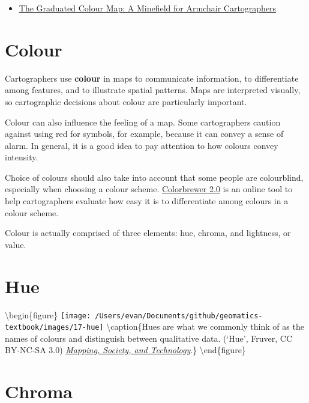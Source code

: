 \documentclass[
]{book}
\providecommand{\tightlist}{%
  \setlength{\itemsep}{0pt}\setlength{\parskip}{0pt}}
\begin{document}
\begin{itemize}
\tightlist
\item
  \href{https://gis.blog.ryerson.ca/2020/03/26/the-graduated-colour-map-a-minefield-for-armchair-cartographers/}{The Graduated Colour Map: A Minefield for Armchair Cartographers}
\end{itemize}

\hypertarget{colour}{%
\section{Colour}\label{colour}}

Cartographers use \textbf{colour} in maps to communicate information, to differentiate among features, and to illustrate spatial patterns. Maps are interpreted visually, so cartographic decisions about colour are particularly important.

Colour can also influence the feeling of a map. Some cartographers caution against using red for symbols, for example, because it can convey a sense of alarm. In general, it is a good idea to pay attention to how colours convey intensity.

Choice of colours should also take into account that some people are colourblind, especially when choosing a colour scheme. \href{https://colorbrewer2.org/\#type=sequential\&scheme=BuGn\&n=3}{Colorbrewer 2.0} is an online tool to help cartographers evaluate how easy it is to differentiate among colours in a colour scheme.

Colour is actually comprised of three elements: hue, chroma, and lightness, or value.

\hypertarget{hue}{%
\section{Hue}\label{hue}}

\textbackslash begin\{figure\}
\texttt{[image: /Users/evan/Documents/github/geomatics-textbook/images/17-hue]} \textbackslash caption\{Hues are what we commonly think of as the names of colours and distinguish between qualitative data. (`Hue', \citet{Adrienne} Fruver, CC BY-NC-SA 3.0) \href{https://open.lib.umn.edu/mapping/chapter/4-design-and-symbolization/\#footnote-399-13}{\emph{Mapping, Society, and Technology}}.\}\label{fig:17-hue}
\textbackslash end\{figure\}

\hypertarget{chroma}{%
\section{Chroma}\label{chroma}}
\end{document}
